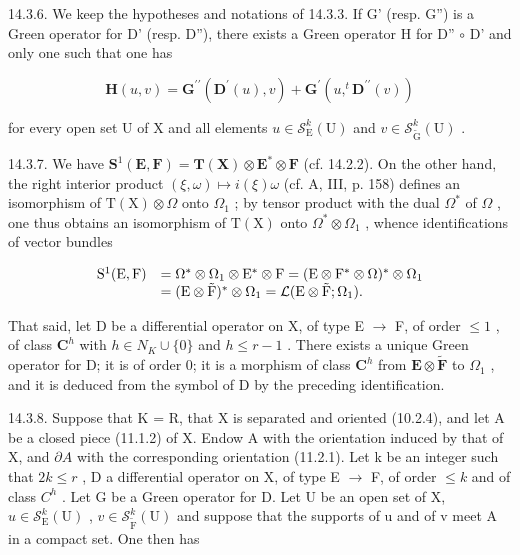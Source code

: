 14.3.6. We keep the hypotheses and notations of 14.3.3. If G' (resp. G'') is a Green operator for D' (resp. D''), there exists a Green operator H for D'' \(\circ\) D' and only one such that one has

\[
\mathbf {H} (u, v) = \mathbf {G} ^ {\prime \prime} (\mathbf {D} ^ {\prime} (u), v) + \mathbf {G} ^ {\prime} (u, ^ {t} \mathbf {D} ^ {\prime \prime} (v))
\]

for every open set U of X and all elements \(u \in \mathcal{S}_{\mathrm{E}}^{k}(\mathrm{U})\) and \(v \in \mathcal{S}_{\widetilde{\mathrm{G}}}^{k}(\mathrm{U})\) .

14.3.7. We have \(\mathbf{S}^1 (\mathbf{E},\mathbf{F}) = \mathbf{T}(\mathbf{X})\otimes \mathbf{E}^*\otimes \mathbf{F}\) (cf. 14.2.2). On the other hand, the right interior product \((\xi ,\omega)\mapsto i(\xi)\omega\) (cf. A, III, p. 158) defines an isomorphism of \(\mathrm{T(X)}\otimes \Omega\) onto \(\Omega_{1}\) ; by tensor product with the dual \(\Omega^{*}\) of \(\Omega\) , one thus obtains an isomorphism of \(\mathrm{T(X)}\) onto \(\Omega^{*}\otimes \Omega_{1}\) , whence identifications of vector bundles

\[
\begin{array}{r l} \mathrm{S} ^ {1} (\mathrm{E}, \mathrm{F}) & = \Omega^ {*} \otimes \Omega_ {1} \otimes \mathrm{E} ^ {*} \otimes \mathrm{F} = (\mathrm{E} \otimes \mathrm{F} ^ {*} \otimes \Omega) ^ {*} \otimes \Omega_ {1} \\ & = (\mathrm{E} \otimes \tilde {\mathrm{F}}) ^ {*} \otimes \Omega_ {1} = \mathcal {L} (\mathrm{E} \otimes \tilde {\mathrm{F}}; \Omega_ {1}). \end{array}
\]

That said, let D be a differential operator on X, of type E \(\to\) F, of order \(\leqslant1\) , of class \(\mathbf{C}^{h}\) with \(h \in N_{K} \cup \{0\}\) and \(h \leqslant r-1\) . There exists a unique Green operator for D; it is of order 0; it is a morphism of class \(\mathbf{C}^{h}\) from \(\mathbf{E}\otimes\widetilde{\mathbf{F}}\) to \(\Omega_{1}\) , and it is deduced from the symbol of D by the preceding identification.

14.3.8. Suppose that K = R, that X is separated and oriented (10.2.4), and let A be a closed piece (11.1.2) of X. Endow A with the orientation induced by that of X, and \(\partial A\) with the corresponding orientation (11.2.1). Let k be an integer such that \(2k \leqslant r\) , D a differential operator on X, of type E \(\to\) F, of order \(\leqslant k\) and of class \(C^{h}\) . Let G be a Green operator for D. Let U be an open set of X, \(u \in \mathcal{S}_{\mathrm{E}}^{k}(\mathrm{U})\) , \(v \in \mathcal{S}_{\widetilde{\mathrm{F}}}^{k}(\mathrm{U})\) and suppose that the supports of u and of v meet A in a compact set. One then has

